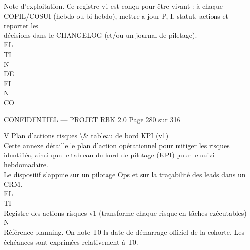 \vspace{0.5em}
Note d’exploitation.      Ce registre v1 est conçu pour être vivant : à chaque COPIL/COSUI (hebdo ou bi-hebdo), mettre à jour P, I, statut, actions et reporter les\\
décisions dans le CHANGELOG (et/ou un journal de pilotage).\\
\vspace{0.5em}
\vspace{0.5em}
\vspace{0.5em}
\vspace{0.5em}
EL\\
TI\\
N\\
DE\\
FI\\
N\\
CO\\
\vspace{0.5em}
\vspace{0.5em}
\vspace{0.5em}
\vspace{0.5em}
\begin{confidential}CONFIDENTIEL — PROJET RBK 2.0                                         Page 280 sur 316\end{confidential}
V \textbar{} Plan d’actions risques \textbackslash{}& tableau de bord KPI (v1)\\
\vspace{0.5em}
\vspace{0.5em}
Cette annexe détaille le plan d’action opérationnel pour mitiger les risques identifiés, ainsi que le tableau de bord de pilotage (KPI) pour le suivi hebdomadaire.\\
Le dispositif s’appuie sur un pilotage Ops et sur la traçabilité des leads dans un CRM.\\
\vspace{0.5em}
\vspace{0.5em}
\vspace{0.5em}
\vspace{0.5em}
EL\\
TI\\
Registre des actions risques v1 (transforme chaque risque en tâches exécutables)\\
\vspace{0.5em}
\vspace{0.5em}
\vspace{0.5em}
\vspace{0.5em}
N\\
Référence planning.          On note T0 la date de démarrage officiel de la cohorte. Les échéances sont exprimées relativement à T0.\\

